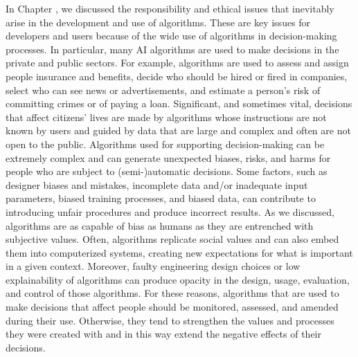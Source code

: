 In Chapter , we discussed the responsibility and ethical issues that inevitably arise in the development and use of algorithms. These are key issues for developers and users because of the wide use of algorithms in decision-making processes. In particular, many AI algorithms are used to make decisions in the private and public sectors. For example, algorithms are used to assess and assign people insurance and benefits, decide who should be hired or fired in companies, select who can see news or advertisements, and estimate a person's risk of committing crimes or of paying a loan. Significant, and sometimes vital, decisions that affect citizens' lives are made by algorithms whose instructions are not known by users and guided by data that are large and complex and often are not open to the public. Algorithms used for supporting decision-making can be extremely complex and can generate unexpected biases, risks, and harms for people who are subject to (semi-)automatic decisions. Some factors, such as designer biases and mistakes, incomplete data and/or inadequate input parameters, biased training processes, and biased data, can contribute to introducing unfair procedures and produce incorrect results. As we discussed, algorithms are as capable of bias as humans as they are entrenched with subjective values. Often, algorithms replicate social values and can also embed them into computerized systems, creating new expectations for what is important in a given context. Moreover, faulty engineering design choices or low explainability of algorithms can produce opacity in the design, usage, evaluation, and control of those algorithms. For these reasons, algorithms that are used to make decisions that affect people should be monitored, assessed, and amended during their use. Otherwise, they tend to strengthen the values and processes they were created with and in this way extend the negative effects of their decisions.

